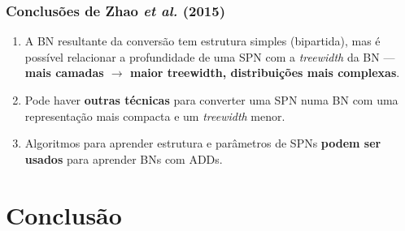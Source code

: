 \documentclass[dvipsnames]{beamer}
\begin{document}
%
%
%
%
%

  \begin{frame}
    \frametitle{Conclusões de Zhao \emph{et al.} (2015)}

    \begin{enumerate}
      \item A BN resultante da conversão tem estrutura simples (bipartida), mas é possível relacionar a profundidade de uma SPN com a \emph{treewidth} da BN --- \textbf{mais camadas $\rightarrow$ maior treewidth, distribuições mais complexas}.
      \item Pode haver \textbf{outras técnicas} para converter uma SPN numa BN com uma representação mais compacta e um \emph{treewidth} menor.
      \item Algoritmos para aprender estrutura e parâmetros de SPNs \textbf{podem ser usados} para aprender BNs com ADDs.
    \end{enumerate}
  \end{frame}

  \section{Conclusão}
\end{document}
